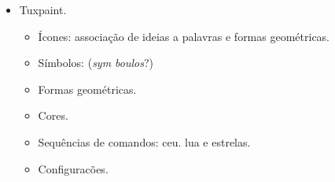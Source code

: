 \begin{itemize}
	\item Tuxpaint.
	\begin{itemize}
		\item Ícones: associação de ideias a palavras e formas geométricas.
		\item Símbolos: (\textit{sym boulos}?)
		\item Formas geométricas.
		\item Cores.
		\item Sequências de comandos: ceu. lua e estrelas.
		\item Configuracões.
	\end{itemize}
\end{itemize}
